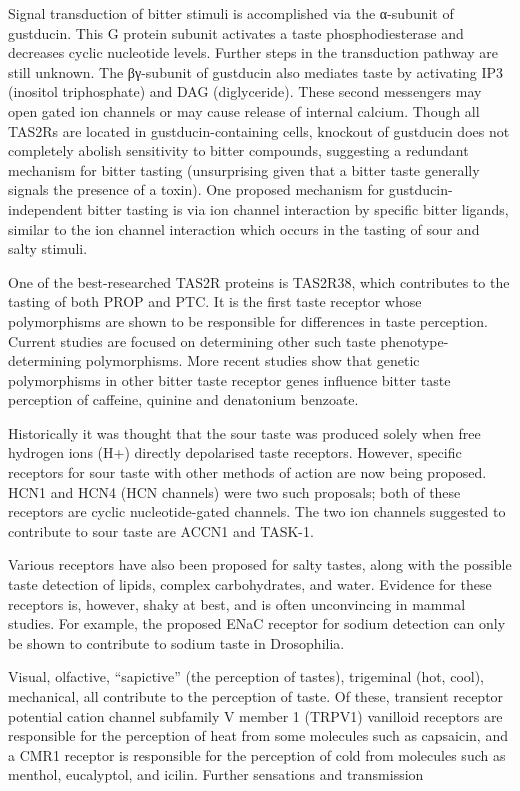 \documentclass[]{book}
\begin{document}
Signal transduction of bitter stimuli is accomplished via the α-subunit of gustducin. This G protein subunit activates a taste phosphodiesterase and decreases cyclic nucleotide levels. Further steps in the transduction pathway are still unknown. The βγ-subunit of gustducin also mediates taste by activating IP3 (inositol triphosphate) and DAG (diglyceride). These second messengers may open gated ion channels or may cause release of internal calcium. Though all TAS2Rs are located in gustducin-containing cells, knockout of gustducin does not completely abolish sensitivity to bitter compounds, suggesting a redundant mechanism for bitter tasting (unsurprising given that a bitter taste generally signals the presence of a toxin). One proposed mechanism for gustducin-independent bitter tasting is via ion channel interaction by specific bitter ligands, similar to the ion channel interaction which occurs in the tasting of sour and salty stimuli.

One of the best-researched TAS2R proteins is TAS2R38, which contributes to the tasting of both PROP and PTC. It is the first taste receptor whose polymorphisms are shown to be responsible for differences in taste perception. Current studies are focused on determining other such taste phenotype-determining polymorphisms. More recent studies show that genetic polymorphisms in other bitter taste receptor genes influence bitter taste perception of caffeine, quinine and denatonium benzoate.

Historically it was thought that the sour taste was produced solely when free hydrogen ions (H+) directly depolarised taste receptors. However, specific receptors for sour taste with other methods of action are now being proposed. HCN1 and HCN4 (HCN channels) were two such proposals; both of these receptors are cyclic nucleotide-gated channels. The two ion channels suggested to contribute to sour taste are ACCN1 and TASK-1.

Various receptors have also been proposed for salty tastes, along with the possible taste detection of lipids, complex carbohydrates, and water. Evidence for these receptors is, however, shaky at best, and is often unconvincing in mammal studies. For example, the proposed ENaC receptor for sodium detection can only be shown to contribute to sodium taste in Drosophilia.

Visual, olfactive, ``sapictive'' (the perception of tastes), trigeminal (hot, cool), mechanical, all contribute to the perception of taste. Of these, transient receptor potential cation channel subfamily V member 1 (TRPV1) vanilloid receptors are responsible for the perception of heat from some molecules such as capsaicin, and a CMR1 receptor is responsible for the perception of cold from molecules such as menthol, eucalyptol, and icilin.
Further sensations and transmission
\end{document}
